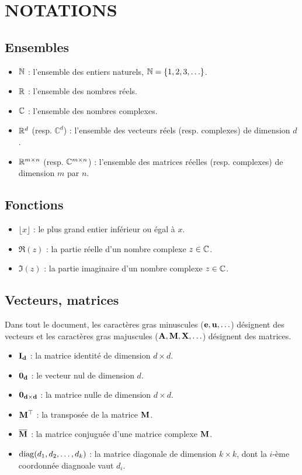 \chapter*{NOTATIONS}
%

\section*{Ensembles}
\begin{itemize}
    \item $\bb{N}$ : l'ensemble des entiers naturels, $\bb{N} = \{1, 2, 3, \ldots \}$.
    \item $\R$ : l'ensemble des nombres réels.
    \item $\bb{C}$ : l'ensemble des nombres complexes.
    \item $\R^d$ (resp. $\mathbb{C}^d$) : l'ensemble des vecteurs réels (resp. complexes) de dimension $d$.
    \item $\R^{m \times n}$ (resp. $\bb{C}^{m \times n}$) : l'ensemble des matrices réelles (resp. complexes) de dimension $m$ par $n$.
 \end{itemize}
 
 \section*{Fonctions}
 \begin{itemize}
    \item $\lfloor x \rfloor$ : le plus grand entier inférieur ou égal à $x$.
     \item $\Re(z)$ : la partie réelle d'un nombre complexe $z \in \bb{C}$.
     \item $\Im(z)$ : la partie imaginaire d'un nombre complexe $z \in \bb{C}$.
 \end{itemize}
 
 \section*{Vecteurs, matrices}
 
 Dans tout le document, les caractères gras minuscules ($\bf{e, u, \ldots}$) désignent des vecteurs et les caractères gras majuscules ($\bf{A, M, X, \ldots}$) désignent des matrices.
 
 \begin{itemize}
    \item $\bf{I_d}$ : la matrice identité de dimension $d \times d$.
    \item $\bf{0_d}$ : le vecteur nul de dimension $d$.
    \item $\bf{0_{d \times d}}$ : la matrice nulle de dimension $d \times d$.
    \item $\bf{M}^\top$ : la transposée de la matrice $\bf{M}$.
    \item $\compconj{\bf{M}}$ : la matrice conjuguée d'une matrice complexe $\bf{M}$.
    \item $\diag(d_1, d_2, \ldots, d_k)$ : la matrice diagonale de dimension $k \times k$, dont la $i$-ème coordonnée diagnoale vaut $d_i$.
\end{itemize}

